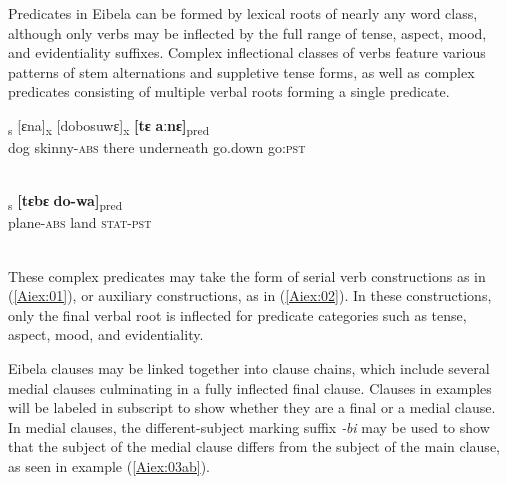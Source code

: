 \documentclass[output=paper]{LSP/langsci}
\begin{document}
Predicates in Eibela can be formed by lexical roots of nearly any word class, although only verbs may be inflected by the full range of tense, aspect, mood, and evidentiality suffixes. Complex inflectional classes of verbs feature various patterns of stem alternations and suppletive tense forms, as well as complex predicates consisting of multiple verbal roots forming a single predicate. 

\begin{exe}
\ex \label{Aiex:01}
\textsubscript{s} [ɛna]\textsubscript{x} [dobosuwɛ]\textsubscript{x} \textbf{[tɛ} 	\textbf{aːnɛ]}\textsubscript{pred}\\
dog	skinny-\textsc{abs}	there	underneath	go.down 	go\textsc{:pst}\\
\glt {}\\
\end{exe}


\begin{exe}
\ex \label{Aiex:02}
\gll [sobolo-wa]\textsubscript{s} \textbf{[tɛbɛ} 	 \textbf{do-wa]}\textsubscript{pred}\\
plane-\textsc{abs}	land	\textsc{stat}-\textsc{pst}\\
\glt {}\\
\end{exe}



These complex predicates may take the form of serial verb constructions as in (\ref{Aiex:01}), or auxiliary constructions, as in (\ref{Aiex:02}). In these constructions, only the final verbal root is inflected for predicate categories such as tense, aspect, mood, and evidentiality.

Eibela clauses may be linked together into clause chains, which include several medial clauses culminating in a fully inflected final clause. Clauses in examples will be labeled in subscript to show whether they are a final or a medial clause. In medial clauses, the different-subject marking suffix \textit{‑bi} may be used to show that the subject of the medial clause differs from the subject of the main clause, as seen in example (\ref{Aiex:03ab}).
\end{document}

